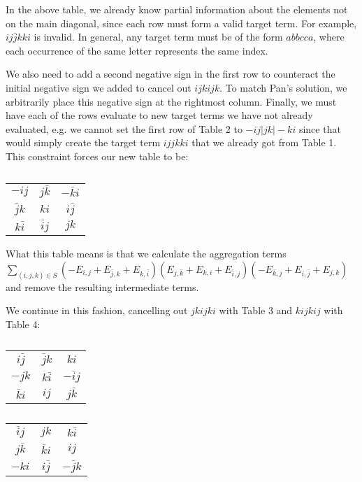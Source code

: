 \documentclass{article}
\begin{document}
In the above table, we already know partial information about the elements not on the main diagonal, since each row must form a valid target term. For example, $ij\bar{j}kki$ is invalid. In general, any target term must be of the form $abbcca$, where each occurrence of the same letter represents the same index.

We also need to add a second negative sign in the first row to counteract the initial negative sign we added to cancel out $ijkijk$. To match Pan's solution, we arbitrarily place this negative sign at the rightmost column. Finally, we must have each of the rows evaluate to new target terms we have not already evaluated, e.g. we cannot set the first row of Table 2 to $-ij|jk|-ki$ since that would simply create the target term $ijjkki$ that we already got from Table 1. This constraint forces our new table to be:

\begin{table}[H]
    \centering
    \begin{tabular}{c|c|c}
        $-ij$ & $j\bar{k}$ & $-\bar{k}i$ \\
        $\bar{j}k$ & $ki$ & $i\bar{j}$ \\
        $k\bar{i}$ & $\bar{i}j$ & $jk$ \\
    \end{tabular}
    \caption{}
\end{table}

What this table means is that we calculate the aggregation terms $\sum_{(i,j,k)\in S}(-E_{i,j}+E_{\bar{j},k}+E_{k,\bar{i}})(E_{j,\bar{k}}+E_{k,i}+E_{\bar{i},j})(-E_{\bar{k},j}+E_{i,\bar{j}}+E_{j,k})$ and remove the resulting intermediate terms.

We continue in this fashion, cancelling out $jkijki$ with Table 3 and $kijkij$ with Table 4:

\begin{table}[H]
    \centering
    \begin{tabular}{c|c|c}
        $i\bar{j}$ & $\bar{j}k$ & $ki$ \\
        $-jk$ & $k\bar{i}$ & $-\bar{i}j$ \\
        $\bar{k}i$ & $ij$ & $j\bar{k}$ \\
    \end{tabular}
    \caption{}
\end{table}

\begin{table}[H]
    \centering
    \begin{tabular}{c|c|c}
        $\bar{i}j$ & $jk$ & $k\bar{i}$ \\
        $j\bar{k}$ & $\bar{k}i$ & $ij$ \\
        $-ki$ & $i\bar{j}$ & $-\bar{j}k$ \\
    \end{tabular}
    \caption{}
\end{table}
\end{document}
